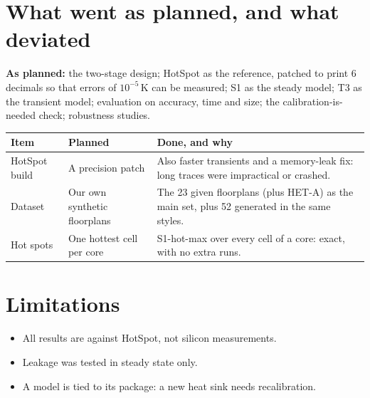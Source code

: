 \documentclass[11pt,a4paper]{article}
\begin{document}
\section{What went as planned, and what deviated}
\textbf{As planned:} the two-stage design; HotSpot as the reference, patched to print 6 decimals so
that errors of $10^{-5}$\,K can be measured; S1 as the steady model; T3 as the transient model;
evaluation on accuracy, time and size; the calibration-is-needed check; robustness studies.

\begin{center}
\small
\begin{tabular}{@{}p{2.6cm} p{4.4cm} p{8cm}@{}}
\toprule
Item & Planned & Done, and why \\
\midrule
HotSpot build & A precision patch & Also faster transients and a memory-leak fix: long traces were
impractical or crashed. \\
Dataset & Our own synthetic floorplans & The 23 given floorplans (plus HET-A) as the main set,
plus 52 generated in the same styles. \\
Hot spots & One hottest cell per core & S1-hot-max over every cell of a core: exact, with no
extra runs. \\
\bottomrule
\end{tabular}
\end{center}

\section{Limitations}
\begin{itemize}
  \item All results are against HotSpot, not silicon measurements.
  \item Leakage was tested in steady state only.
  \item A model is tied to its package: a new heat sink needs recalibration.
\end{itemize}

\end{document}
